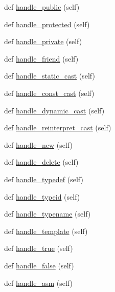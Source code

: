 \begin{DoxyCompactItemize}
\item 
def \hyperlink{classcpp_1_1ast_1_1_ast_builder_a1e69925578e0ee0a2b7aeb219eda449b}{handle\+\_\+public} (self)
\item 
def \hyperlink{classcpp_1_1ast_1_1_ast_builder_aa4ff62142927f8f245a2030b444676ee}{handle\+\_\+protected} (self)
\item 
def \hyperlink{classcpp_1_1ast_1_1_ast_builder_a8bc5f9563f5ead3abba5a71187162867}{handle\+\_\+private} (self)
\item 
def \hyperlink{classcpp_1_1ast_1_1_ast_builder_ab9f7d81019317c6ccfd492bd2c0c9579}{handle\+\_\+friend} (self)
\item 
def \hyperlink{classcpp_1_1ast_1_1_ast_builder_ab7577b3a2bd22c1bccb656493de379f3}{handle\+\_\+static\+\_\+cast} (self)
\item 
def \hyperlink{classcpp_1_1ast_1_1_ast_builder_a4dae74f1d036f63fc1080962ab0208fc}{handle\+\_\+const\+\_\+cast} (self)
\item 
def \hyperlink{classcpp_1_1ast_1_1_ast_builder_a659b5ad02ffebe26c1496a319128fbd1}{handle\+\_\+dynamic\+\_\+cast} (self)
\item 
def \hyperlink{classcpp_1_1ast_1_1_ast_builder_a06d75904ba7487c7966d073aaa3d74e9}{handle\+\_\+reinterpret\+\_\+cast} (self)
\item 
def \hyperlink{classcpp_1_1ast_1_1_ast_builder_a86f5769e0460524691ae0d135d30f101}{handle\+\_\+new} (self)
\item 
def \hyperlink{classcpp_1_1ast_1_1_ast_builder_aa5b7a781afe524bebdf42bdeb4766507}{handle\+\_\+delete} (self)
\item 
def \hyperlink{classcpp_1_1ast_1_1_ast_builder_a808eb3d955ca2e3a957abb35dc577c66}{handle\+\_\+typedef} (self)
\item 
def \hyperlink{classcpp_1_1ast_1_1_ast_builder_ac30cfc1a3a455310a9ccac885d2d0d7c}{handle\+\_\+typeid} (self)
\item 
def \hyperlink{classcpp_1_1ast_1_1_ast_builder_a4b7b3bb4f47f67052b04e5da173d1c6b}{handle\+\_\+typename} (self)
\item 
def \hyperlink{classcpp_1_1ast_1_1_ast_builder_a0f4d74520697ec05eb6b549daada5a5d}{handle\+\_\+template} (self)
\item 
def \hyperlink{classcpp_1_1ast_1_1_ast_builder_ad480255644817388b81b05acc4aa9c9a}{handle\+\_\+true} (self)
\item 
def \hyperlink{classcpp_1_1ast_1_1_ast_builder_afe125e384026baf74b55593b254fc10c}{handle\+\_\+false} (self)
\item 
def \hyperlink{classcpp_1_1ast_1_1_ast_builder_acf6ec42d567cd85a9bad77772c381a4e}{handle\+\_\+asm} (self)

\end{DoxyCompactItemize}
